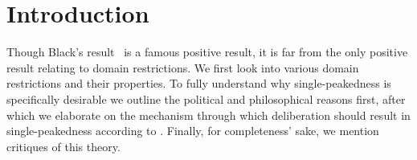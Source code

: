 \newpage
\chapter{Introduction}
\label{Introduction}

Though Black's result~\citep{blackRationaleGroupDecisionmaking1948} is a famous positive result, it is far from the only positive result relating to domain restrictions. We first look into various domain restrictions and their properties. To fully understand why single-peakedness is specifically desirable we outline the political and philosophical reasons first, after which we elaborate on the mechanism through which deliberation should result in single-peakedness according to \citet{listTwoConceptsAgreement2002}. Finally, for completeness' sake, we mention critiques of this theory.

%
%
%
%
%
%
%
%
